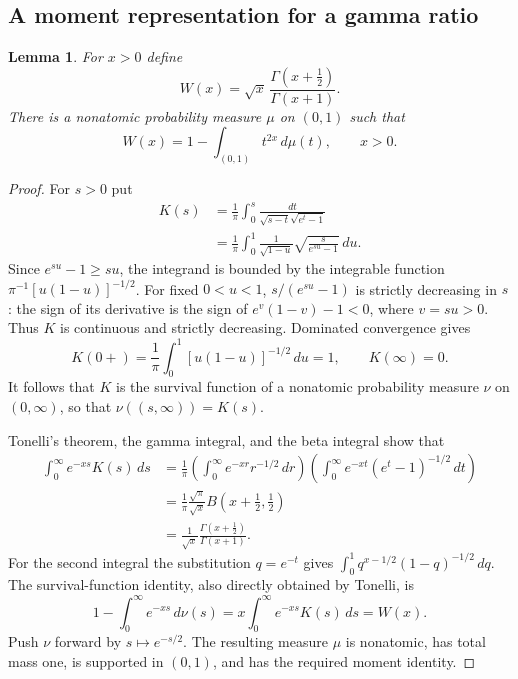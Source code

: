 \documentclass[11pt,a4paper]{article}
\newtheorem{lemma}[theorem]{Lemma}
\theoremstyle{remark}
\begin{document}
\subsection{A moment representation for a gamma ratio}

\begin{lemma}
For $x>0$ define
\[
 W(x)=\sqrt{x}\,\frac{\Gamma(x+\tfrac12)}{\Gamma(x+1)}.
\]
There is a nonatomic probability measure $\mu$ on $(0,1)$ such that
\[
 W(x)=1-\int_{(0,1)}t^{2x}\,d\mu(t),\qquad x>0.
\]
\end{lemma}

\begin{proof}
For $s>0$ put
\begin{align*}
 K(s)
 &=\frac1\pi\int_0^s\frac{dt}{\sqrt{s-t}\sqrt{e^t-1}}\\
 &=\frac1\pi\int_0^1\frac1{\sqrt{1-u}}
                   \sqrt{\frac{s}{e^{su}-1}}\,du.
\end{align*}
Since $e^{su}-1\ge su$, the integrand is bounded by the integrable
function $\pi^{-1}[u(1-u)]^{-1/2}$.  For fixed $0<u<1$,
$s/(e^{su}-1)$ is strictly decreasing in $s$: the sign of its derivative
is the sign of $e^v(1-v)-1<0$, where $v=su>0$.  Thus $K$ is continuous
and strictly decreasing.  Dominated convergence gives
\[
 K(0+)=\frac1\pi\int_0^1[u(1-u)]^{-1/2}\,du=1,
 \qquad K(\infty)=0.
\]
It follows that $K$ is the survival function of a nonatomic probability
measure $\nu$ on $(0,\infty)$, so that
$\nu((s,\infty))=K(s)$.

Tonelli's theorem, the gamma integral, and the beta integral show that
\begin{align*}
 \int_0^\infty e^{-xs}K(s)\,ds
 &=\frac1\pi
   \left(\int_0^\infty e^{-xr}r^{-1/2}\,dr\right)
   \left(\int_0^\infty e^{-xt}(e^t-1)^{-1/2}\,dt\right)\\
 &=\frac1\pi\frac{\sqrt\pi}{\sqrt x}
                 B\left(x+\tfrac12,\tfrac12\right)\\
 &=\frac1{\sqrt x}\frac{\Gamma(x+\tfrac12)}{\Gamma(x+1)}.
\end{align*}
For the second integral the substitution $q=e^{-t}$ gives
$\int_0^1q^{x-1/2}(1-q)^{-1/2}\,dq$.
The survival-function identity, also directly obtained by Tonelli, is
\[
 1-\int_0^\infty e^{-xs}\,d\nu(s)
  =x\int_0^\infty e^{-xs}K(s)\,ds=W(x).
\]
Push $\nu$ forward by $s\mapsto e^{-s/2}$.  The resulting measure $\mu$
is nonatomic, has total mass one, is supported in $(0,1)$, and has the
required moment identity.
\end{proof}
\end{document}
